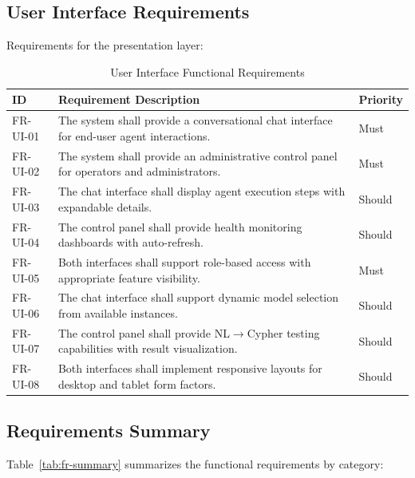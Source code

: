 \documentclass[a4paper,twoside]{sapthesis}
\begin{document}
\subsection{User Interface Requirements}
\label{subsec:fr-ui}

Requirements for the presentation layer:

\begin{table}[htbp]
\centering
\caption{User Interface Functional Requirements}
\label{tab:fr-ui}
\small
\begin{tabularx}{\textwidth}{|l|X|l|}
\hline
\textbf{ID} & \textbf{Requirement Description} & \textbf{Priority} \\
\midrule
FR-UI-01 & The system shall provide a conversational chat interface for end-user agent interactions. & Must \\
\midrule
FR-UI-02 & The system shall provide an administrative control panel for operators and administrators. & Must \\
\midrule
FR-UI-03 & The chat interface shall display agent execution steps with expandable details. & Should \\
\midrule
FR-UI-04 & The control panel shall provide health monitoring dashboards with auto-refresh. & Should \\
\midrule
FR-UI-05 & Both interfaces shall support role-based access with appropriate feature visibility. & Must \\
\midrule
FR-UI-06 & The chat interface shall support dynamic model selection from available instances. & Should \\
\midrule
FR-UI-07 & The control panel shall provide NL$\rightarrow$Cypher testing capabilities with result visualization. & Should \\
\midrule
FR-UI-08 & Both interfaces shall implement responsive layouts for desktop and tablet form factors. & Should \\
\midrule
\end{tabularx}
\end{table}

\subsection{Requirements Summary}
\label{subsec:fr-summary}

Table~\ref{tab:fr-summary} summarizes the functional requirements by category:
\end{document}
